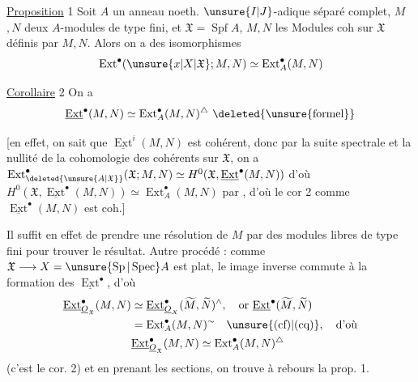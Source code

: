 \uline{Proposition} 1 \quad Soit $A$ un anneau noeth. $\unsure{I|J}$-adique séparé complet, $M$$,N$ deux $A$-modules de type fini, et $\mathfrak X=\operatorname{Spf} A$, $M,N$ les Modules coh sur $\mathfrak X$ définis par $M,N$. Alors on a des isomorphismes
\[
 \operatorname{Ext}^{\bullet}(\unsure{x|X|\mathfrak X};M,N)\simeq\operatorname{Ext}^{\bullet}_A(M,N)
\]

\uline{Corollaire} 2 \quad On a
\[
 \underline{\operatorname{Ext}}^{\bullet}(M,N)\simeq\operatorname{Ext}^{\bullet}_A(M,N)^{\triangle}\ \deleted{\unsure{\text{formel}}}
\]

[en effet, on sait que  $\underline{\operatorname{Ext}}^{i}(M,N)$ est cohérent, donc par la suite spectrale et la nullité de la cohomologie des cohérents sur $\mathfrak X$, on a $\operatorname{Ext}^{\bullet}_{\deleted{\unsure{A|\mathfrak X}}}(\mathfrak X;M,N)\simeq H^0(\mathfrak X,\underline{\operatorname{Ext}}^{\bullet}(M,N))$  d'où $H^0(\mathfrak X,\underline{\operatorname{Ext}}^{\bullet}(M,N))\simeq\operatorname{Ext}^{\bullet}_A(M,N)$ par , d'où le cor 2 comme $\underline{\operatorname{Ext}}^{\bullet}(M,N)$ est coh.]

Il suffit en effet de prendre une résolution  de $M$ par des modules libres de type fini pour trouver le résultat. Autre procédé : comme $\mathfrak X\longrightarrow X=\unsure{\operatorname{Sp}|\operatorname{Spec}} A$ est plat,  le  image inverse commute à la formation des $\underline{\operatorname{Ext}}^{\bullet}$, d'où
\[
\begin{aligned}
 \underline{\operatorname{Ext}}^{\bullet}_{\underline O_{\mathfrak X}}(M,N)
 &\simeq\underline{\operatorname{Ext}}^{\bullet}_{\underline O_X}(\widetilde M,\widetilde N)^{\wedge},\quad
 \text{or }\underline{\operatorname{Ext}}^{\bullet}(\widetilde M,\widetilde N)\\
 &=\operatorname{Ext}^{\bullet}_A(M,N)^{\sim}\quad\unsure{(\text{cf})|(\text{cq})},\quad\text{d'où}\\
 &\underline{\operatorname{Ext}}^{\bullet}_{\underline O_{\mathfrak X}}(M,N)\simeq\operatorname{Ext}^{\bullet}_A(M,N)^\triangle
\end{aligned}
\]
(c'est le cor. 2) et en prenant les sections, on trouve à rebours la prop. 1.

